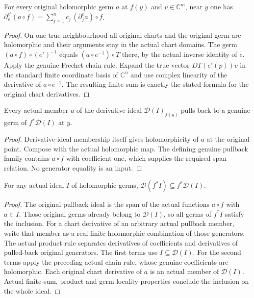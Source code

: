 \begin{lemma}\label{hir:crossdim-chain-rule}
For every original holomorphic germ $a$ at $f(y)$ and $v\in\mathbb C^m$,
near $y$ one has
$\partial^{e'}_v(a\circ f)=\sum_{j=1}^n c_j\, (\partial^e_j a)\circ f$.
\leanok
{}
\end{lemma}
\begin{proof}
On one true neighbourhood all original charts and the original germ are
holomorphic and their arguments stay in the actual chart domains.
The germ $(a\circ f)\circ(e')^{-1}$ equals
$(a\circ e^{-1})\circ T$ there, by the actual inverse identity of $e$.
Apply the genuine Frechet chain rule. Expand the true vector $DT(e'(p))v$
in the standard finite coordinate basis of $\mathbb C^n$ and use complex
linearity of the derivative of $a\circ e^{-1}$. The resulting finite sum
is exactly the stated formula for the original chart derivatives.
\end{proof}

\begin{lemma}\label{hir:crossdim-pulled-derivative-generator}
Every actual member $a$ of the derivative ideal $\mathcal D(I)_{f(y)}$
pulls back to a genuine germ of $f^*\mathcal D(I)$ at $y$.
\leanok
\end{lemma}
\begin{proof}
Derivative-ideal membership itself gives holomorphicity of $a$ at the original
point. Compose with the actual holomorphic map. The defining genuine pullback
family contains $a\circ f$ with coefficient one, which supplies the required
span relation. No generator equality is an input.
\end{proof}

\begin{theorem}\label{hir:crossdim-derivative-inclusion}
For any actual ideal $I$ of holomorphic germs,
$\mathcal D(f^*I)\subseteq f^*\mathcal D(I)$.
\leanok
{}
\end{theorem}
\begin{proof}
The original pullback ideal is the span of the actual functions $a\circ f$
with $a\in I$. Those original germs already belong to $\mathcal D(I)$, so
all germs of $f^*I$ satisfy the inclusion. For a chart derivative of an
arbitrary actual pullback member, write that member as a real finite
holomorphic combination of those generators. The actual product rule
separates derivatives of coefficients and derivatives of pulled-back
original generators. The first terms use $I\subseteq\mathcal D(I)$.
For the second terms apply the preceding actual chain rule, whose genuine
coefficients are holomorphic. Each original chart derivative of $a$ is
an actual member of $\mathcal D(I)$. Actual finite-sum, product and germ
locality properties conclude the inclusion on the whole ideal.
\end{proof}

